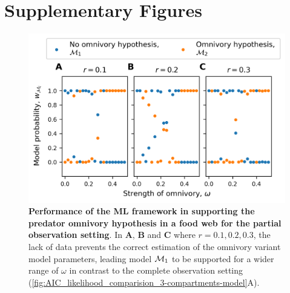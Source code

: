 \section{Supplementary Figures}
\begin{figure}[h]
    \centering
    \includegraphics[]{figures/SI/figure5_2sp.png}
    \caption{\textbf{Performance of the ML framework in supporting the predator omnivory hypothesis in a food web for the partial observation setting}. 
    In \textbf{A},  \textbf{B} and \textbf{C} where $r = 0.1, 0.2 ,0.3$, the lack of data prevents the correct estimation of the omnivory variant model parameters, leading model $\mathcal{M}_1$ to be supported for a wider range of $\omega$ in contrast to the complete observation setting (\cref{fig:AIC_likelihood_comparision_3-compartments-model}A).}
    \label{figSI:model_selection_1sp}
\end{figure}

\FloatBarrier


